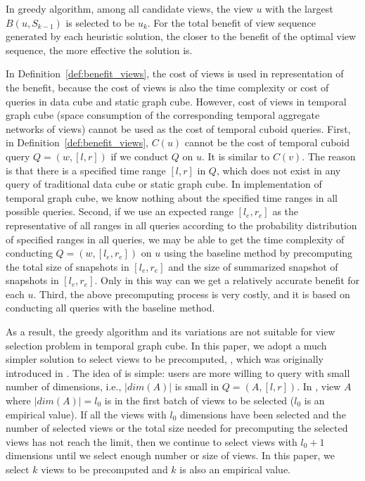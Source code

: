 \documentclass[10pt,journal,compsoc]{IEEEtran}
\begin{document}
In greedy algorithm, among all candidate views, the view $ u $ with the largest $ B(u,S_{k-1}) $ is selected to be $ u_k $. For the total benefit of view sequence generated by each heuristic solution, the closer to the benefit of the optimal view sequence, the more effective the solution is.

In Definition~\ref{def:benefit_views}, the cost of views is used in representation of the benefit, because the cost of views is also the time complexity or cost of queries in data cube and static graph cube. However, cost of views in temporal graph cube (space consumption of the corresponding temporal aggregate networks of views) cannot be used as the cost of temporal cuboid queries. First, in Definition~\ref{def:benefit_views}, $ C(u) $ cannot be the cost of temporal cuboid query $ Q=(w,[l,r]) $ if we conduct $ Q $ on $ u $. It is similar to $ C(v) $. The reason is that there is a specified time range $ [l,r] $ in $ Q $, which does not exist in any query of traditional data cube or static graph cube. In implementation of temporal graph cube, we know nothing about the specified time ranges in all possible queries. Second, if we use an expected range $ [l_e,r_e] $ as the representative of all ranges in all queries according to the probability distribution of specified ranges in all queries, we may be able to get the time complexity of conducting $ Q=(w,[l_e,r_e]) $ on $ u $ using the baseline method by precomputing the total size of snapshots in $ [l_e,r_e] $ and the size of summarized snapshot of snapshots in $ [l_e,r_e] $. Only in this way can we get a relatively accurate benefit for each $ u $. Third, the above precomputing process is very costly, and it is based on conducting all queries with the baseline method. %

As a result, the greedy algorithm and its variations are not suitable for view selection problem in temporal graph cube. In this paper, we adopt a much simpler solution to select views to be precomputed, , which was originally introduced in \cite{zhao2011graph}. The idea of  is simple: users are more willing to query with small number of dimensions, i.e., $ |dim(A)| $ is small in $ Q=(A,[l,r]) $. In , view $ A $ where $ |dim(A)|=l_0 $ is in the first batch of views to be selected ($ l_0 $ is an empirical value). If all the views with $ l_0 $ dimensions have been selected and the number of selected views or the total size needed for precomputing the selected views has not reach the limit, then we continue to select views with $ l_0+1 $ dimensions until we select enough number or size of views. In this paper, we select $ k $ views to be precomputed and $k$ is also an empirical value.
\end{document}
